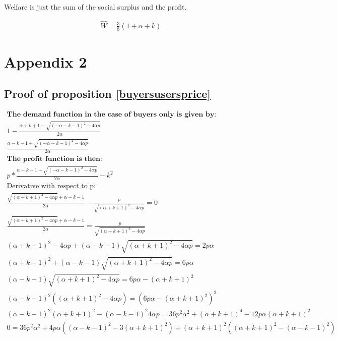 \documentclass[11pt]{article}
\begin{document}
Welfare is just the sum of the social surplus and the profit.

\begin{align*}
\hat{W} = \frac{3}{8} \left( 1 + \alpha +k
\right)
\end{align*}


\section{Appendix 2}

\subsection{Proof of proposition \ref{buyersusersprice}}

\label{buyersuserspriceproof}

\begin{align*}
\textbf{The demand function in the case of buyers only is given by:} \\
1-\frac{\alpha+k+1-\sqrt{(-\alpha-k-1)^2-4 \alpha p}}{2 \alpha} \\
\frac{\alpha-k-1+\sqrt{(-\alpha-k-1)^2-4 \alpha p}}{2 \alpha}
\\
\textbf{The profit function is then:} 
\\
p*\frac{\alpha-k-1+\sqrt{(-\alpha-k-1)^2-4 \alpha p}}{2 \alpha}-k^2
\\
\text{Derivative with respect to p}: \\
\frac{\sqrt{(\alpha+k+1)^2-4 \alpha p}+\alpha-k-1}{2 \alpha}-\frac{p}{\sqrt{(\alpha+k+1)^2-4 \alpha p}} =0
\\
\frac{\sqrt{(\alpha+k+1)^2-4 \alpha p}+\alpha-k-1}{2 \alpha} =\frac{p}{\sqrt{(\alpha+k+1)^2-4 \alpha p}} \\
( \alpha+k+1)^2-4 \alpha p+(\alpha-k-1)\sqrt{(\alpha+k+1)^2-4 \alpha p} = 2 p \alpha \\
( \alpha+k+1)^2+(\alpha-k-1)\sqrt{(\alpha+k+1)^2-4 \alpha p} = 6 p \alpha \\
(\alpha-k-1)\sqrt{(\alpha+k+1)^2-4 \alpha p} = 6 p \alpha - ( \alpha+k+1)^2 \\
(\alpha-k-1)^2((\alpha+k+1)^2-4 \alpha p) = (6 p \alpha - ( \alpha+k+1)^2 )^2
\\
(\alpha-k-1)^2(\alpha+k+1)^2-(\alpha-k-1)^2 4 \alpha p = 36 p^2 \alpha^2 + ( \alpha+k+1)^4 - 12 p \alpha ( \alpha+k+1)^2 
\\
0 = 36 p^2 \alpha^2  +4 p \alpha((\alpha-k-1)^2-3( \alpha+k+1)^2) + ( \alpha+k+1)^2(( \alpha+k+1)^2-(\alpha-k-1)^2)

\end{align*}
\end{document}
